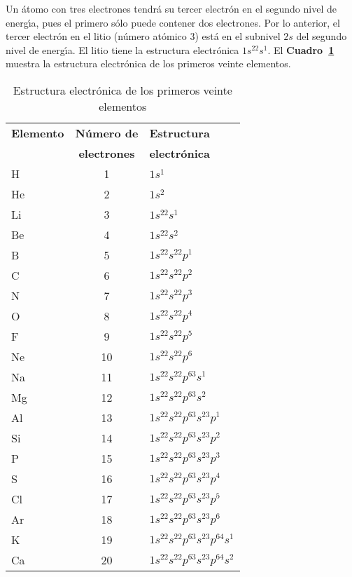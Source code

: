 Un \'atomo con tres electrones tendr\'a su tercer electr\'on en el segundo nivel de energ\'{\i}a, pues el primero s\'olo puede contener dos electrones. Por lo
anterior, el tercer electr\'on en el litio (n\'umero at\'omico 3) est\'a en el subnivel $2s$ del segundo nivel de energ\'{\i}a. El litio tiene la estructura
electr\'onica $1s^22s^1$. El \textbf{Cuadro~\ref{tabla3.3}} muestra la estructura electr\'onica de los primeros veinte elementos.

\begin{table}[ht]
\caption[Estructuras electr\'onicas]{Estructura electr\'onica de los primeros veinte
elementos}
\label{tabla3.3}
\begin{center}
{\small
 \begin{tabular}{lcl}\hline
\textbf{Elemento} & \textbf{N\'umero de} &\textbf{ Estructura} \\
    &       \textbf{electrones}& \textbf{electr\'onica}\\ \hline
H   &  1 & $1s^1$\\
He  &  2 & $1s^2$\\
Li  &  3 & $1s^22s^1$\\
Be  &  4 & $1s^22s^2$\\
B   &  5 & $1s^22s^22p^1$\\
C   &  6 & $1s^22s^22p^2$\\
N   &  7 & $1s^22s^22p^3$\\
O   &  8 & $1s^22s^22p^4$\\
F   &  9 & $1s^22s^22p^5$\\
Ne  & 10 & $1s^22s^22p^6$\\
Na  & 11 & $1s^22s^22p^63s^1$\\
Mg  & 12 & $1s^22s^22p^63s^2$\\
Al  & 13 & $1s^22s^22p^63s^23p^1$\\
Si  & 14 & $1s^22s^22p^63s^23p^2$\\
P   & 15 & $1s^22s^22p^63s^23p^3$\\
S   & 16 & $1s^22s^22p^63s^23p^4$\\
Cl  & 17 & $1s^22s^22p^63s^23p^5$\\
Ar  & 18 & $1s^22s^22p^63s^23p^6$\\
K   & 19 & $1s^22s^22p^63s^23p^64s^1$\\
Ca  & 20 & $1s^22s^22p^63s^23p^64s^2$\\ \hline 
\end{tabular}
}
\end{center}
\end{table} 

